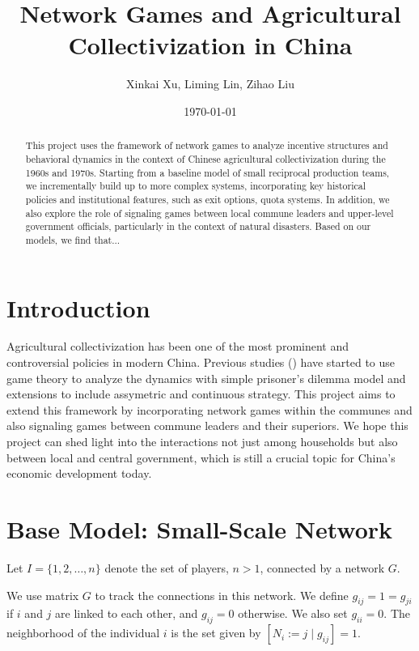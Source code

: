 \documentclass[12pt]{article}
\title{Network Games and Agricultural Collectivization in China}
\author{Xinkai Xu, Liming Lin, Zihao Liu}
\date{\today}
\begin{document}
\maketitle
\onehalfspacing

\begin{abstract}
This project uses the framework of network games to analyze incentive structures and behavioral dynamics in the context of Chinese agricultural collectivization during the 1960s and 1970s. Starting from a baseline model of small reciprocal production teams, we incrementally build up to more complex systems, incorporating key historical policies and institutional features, such as exit options, quota systems. In addition, we also explore the role of signaling games between local commune leaders and upper-level government officials, particularly in the context of natural disasters. Based on our models, we find that...
\end{abstract}

\section{Introduction}
Agricultural collectivization has been one of the most prominent and controversial policies in modern China. Previous studies (\cite{chinnDiligenceLazinessChinese1980, nitzanDiligenceLazinessChinese1987}) have started to use game theory to analyze the dynamics with simple prisoner's dilemma model and extensions to include assymetric and continuous strategy. This project aims to extend this framework by incorporating network games within the communes and also signaling games between commune leaders and their superiors. We hope this project can shed light into the interactions not just among households but also between local and central government, which is still a crucial topic for China's economic development today.\\

\section{Base Model: Small-Scale Network}
Let $I = \{1, 2, \dots, n\}$ denote the set of players, $n > 1$, connected by a network $G$.

We use matrix $G$ to track the connections in this network.  
We define $g_{ij} = 1=g_{ji}$ if $i$ and $j$ are linked to each other, and $g_{ij} = 0$ otherwise.  
We also set $g_{ii} = 0$. The neighborhood of the individual $i$ is the set given by $[ N_i := j \mid g_{ij}] = 1$.
\end{document}
